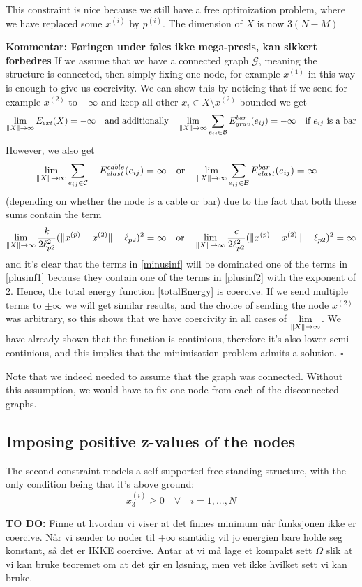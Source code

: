 This constraint is nice because we still have a free optimization problem, where we have replaced some $x^{(i)}$ by $p^{(i)}$. The dimension of $X$ is now $3(N-M)$

\textbf{Kommentar: Føringen under føles ikke mega-presis, kan sikkert forbedres}
If we assume that we have a connected graph $\mathcal{G}$, meaning the structure is connected, then simply fixing one node, for example $x^{(1)}$ in this way is enough to give us coercivity. We can show this by noticing that if we send for example $x^{(2)}$ to $-\infty$ and keep all other $x_i \in X \setminus x^{(2)}$ bounded we get
\begin{equation}
  \lim\limits_{\rVert X \lVert \to \infty} E_{ext}(X) = -\infty
\quad\text{and additionally}\quad
\lim\limits_{\rVert X \lVert \to \infty} \sum\limits_{e_{ij} \in \mathcal{B}} E^{bar}_{grav}(e_{ij}) = -\infty \quad \text{if $e_{ij}$ is a bar}
\label{minusinf}
\end{equation}
However, we also get
\begin{equation}
     \lim\limits_{\rVert X \lVert \to \infty} \sum\limits_{e_{ij} \in \mathcal{C}}\quad E^{cable}_{elast}(e_{ij}) = \infty \quad \text{or}\quad \lim\limits_{\rVert X \lVert \to \infty} \sum\limits_{e_{ij} \in \mathcal{B }}E^{bar}_{elast}(e_{ij}) = \infty \quad
     \label{plusinf1}
\end{equation} (depending on whether the node is a cable or bar)
due to the fact that both these sums contain the term \begin{equation}
 \lim\limits_{\rVert X \lVert \to \infty} \frac{k}{2 \ell_{p2}^2}(\lVert x^{(p)} - x^{(2)} \rVert-\ell_{p2})^2 = \infty \quad \text{or} \quad \lim\limits_{\rVert X \lVert \to \infty} \frac{c}{2 \ell_{p2}^2}(\lVert x^{(p)} - x^{(2)} \rVert-\ell_{p2})^2 = \infty
 \label{plusinf2}
\end{equation}
and it's clear that the terms in \eqref{minusinf} will be dominated one of the terms in \eqref{plusinf1} because they contain one of the terms in \eqref{plusinf2} with the exponent of $2$. Hence, the total energy function \eqref{totalEnergy} is coercive. If we send multiple terms to $\pm \infty$ we will get similar results, and the choice of sending the node $x^{(2)}$ was arbitrary, so this shows that we have coercivity in all cases of $\lim\limits_{\rVert X \lVert \to \infty}$. We have already shown that the function is continious, therefore it's also lower semi continious, and this implies that the minimisation problem admits a solution. $\square$

Note that we indeed needed to assume that the graph was connected. Without this assumption, we would have to fix one node from each of the disconnected graphs.

\subsection{Imposing positive z-values of the nodes}
The second constraint models a self-supported free standing structure, with the only condition being that it's above ground:
\begin{equation}
    x_3^{(i)} \geq 0 \quad \forall \quad i = 1,...,N
\end{equation}

\textbf{TO DO:}
Finne ut hvordan vi viser at det finnes minimum når funksjonen ikke er coercive. Når vi sender to noder til $+\infty$ samtidig vil jo energien bare holde seg konstant, så det er IKKE coercive. Antar at vi må lage et kompakt sett $\Omega$ slik at vi kan bruke teoremet om at det gir en løsning, men vet ikke hvilket sett vi kan bruke.